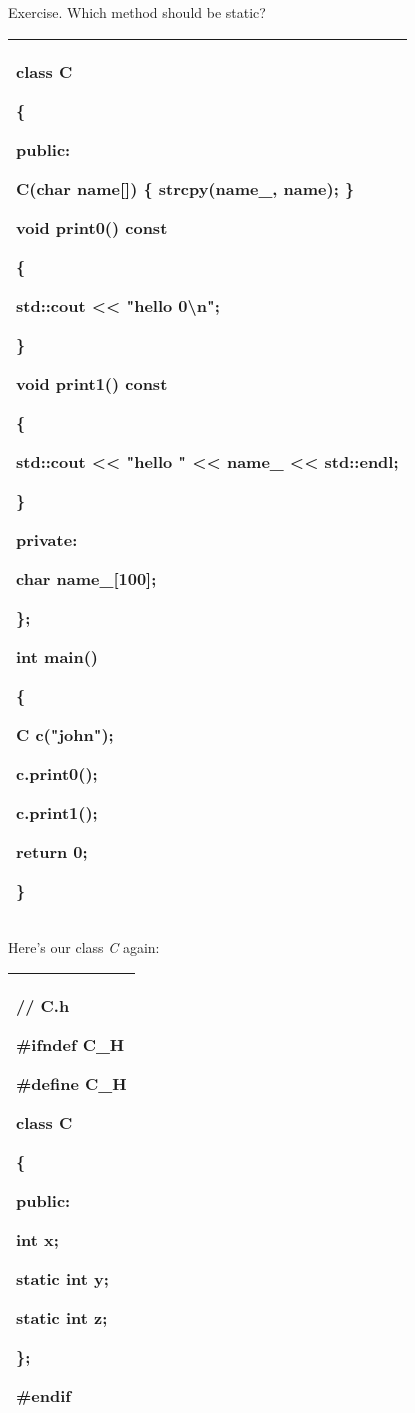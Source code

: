 \documentclass[
]{article}
\begin{document}
Exercise. Which method should be static?

\begin{longtable}[]{@{}l@{}}
\toprule
\endhead
\begin{minipage}[t]{0.97\columnwidth}\raggedright
class C

\{

public:

C(char name{[}{]}) \{ strcpy(name\_, name); \}

void print0() const

\{

std::cout \textless\textless{} "hello 0\textbackslash n";

\}

void print1() const

\{

std::cout \textless\textless{} "hello " \textless\textless{} name\_
\textless\textless{} std::endl;

\}

private:

char name\_{[}100{]};

\};

int main()

\{

C c("john");

c.print0();

c.print1();

return 0;

\}\strut
\end{minipage}\tabularnewline
\bottomrule
\end{longtable}

Here's our class \emph{C} again:

\begin{longtable}[]{@{}l@{}}
\toprule
\endhead
\begin{minipage}[t]{0.97\columnwidth}\raggedright
// C.h

\#ifndef C\_H

\#define C\_H

class C

\{

public:

int x;

static int y;

static int z;

\};

\#endif\strut
\end{minipage}\tabularnewline
\bottomrule
\end{longtable}
\end{document}
